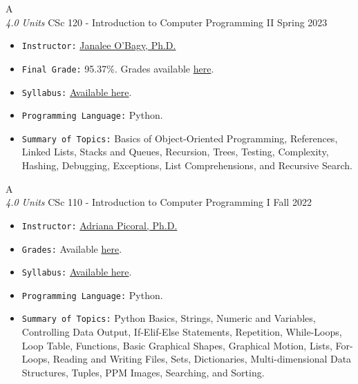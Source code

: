 \cventry
{A \\ \small{\textit{4.0 Units}}}
{CSc 120 - Introduction to Computer Programming II}
{Spring 2023}
{}
{}
{
  \begin{itemize}
    \item \texttt{Instructor:} \href{https://cs.arizona.edu/person/janalee-obagy-0}{Janalee O'Bagy, Ph.D.}
    \item \texttt{Final Grade:} 95.37\%. Grades available \href{https://mhrezaei.com/assets/cv/courses/Spring2023/CSC120/Grades.pdf}{here}.
    \item \texttt{Syllabus:} \href{https://mhrezaei.com/assets/cv/courses/Spring2023/CSC120/Syllabus.pdf}{Available here}.
    \item \texttt{Programming Language:} Python.
    \item \texttt{Summary of Topics:} Basics of Object-Oriented Programming, References, Linked Lists, Stacks and Queues, Recursion, Trees, Testing, Complexity, Hashing, Debugging, Exceptions, List Comprehensions, and Recursive Search.
  \end{itemize}
}

\cventry
{A \\ \small{\textit{4.0 Units}}}
{CSc 110 - Introduction to Computer Programming I}
{Fall 2022}
{}
{}
{
  \begin{itemize}
    \item \texttt{Instructor:} \href{https://adrianapicoral.com/}{Adriana Picoral, Ph.D.}
    \item \texttt{Grades:} Available \href{https://mhrezaei.com/assets/cv/courses/Fall2022/CSC110/Grades.pdf}{here}.
    \item \texttt{Syllabus:} \href{https://mhrezaei.com/assets/cv/courses/Fall2022/CSC110/Syllabus.pdf}{Available here}.
    \item \texttt{Programming Language:} Python.
    \item \texttt{Summary of Topics:} Python Basics, Strings, Numeric and Variables, Controlling Data Output, If-Elif-Else Statements, Repetition, While-Loops, Loop Table, Functions, Basic Graphical Shapes, Graphical Motion, Lists, For-Loops, Reading and Writing Files, Sets, Dictionaries, Multi-dimensional Data Structures, Tuples, PPM Images, Searching, and Sorting.
  \end{itemize}
}